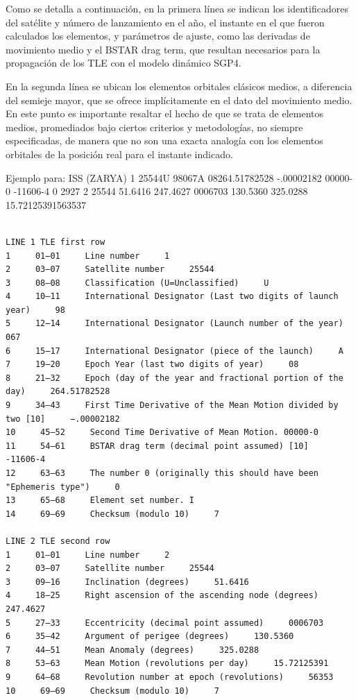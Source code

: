 Como se detalla a continuación, en la primera línea se indican los identificadores del satélite y número de lanzamiento en el año, el instante en el que fueron calculados los elementos, y parámetros de ajuste, como las derivadas de movimiento medio y el BSTAR drag term, que resultan necesarios para la propagación de los TLE con el modelo dinámico SGP4.

En la segunda línea se ubican los elementos orbitales clásicos medios, a diferencia del semieje mayor, que se ofrece implícitamente en el dato del movimiento medio. En este punto es importante resaltar el hecho de que se trata de elementos medios, promediados bajo ciertos criterios y metodologías, no siempre especificadas, de manera que no son una exacta analogía con los elementos orbitales de la posición real para el instante indicado.


Ejemplo para: ISS (ZARYA)
1 25544U 98067A   08264.51782528 -.00002182  00000-0 -11606-4 0  2927
2 25544  51.6416 247.4627 0006703 130.5360 325.0288 15.72125391563537


\begin{verbatim}
 
LINE 1 TLE first row
1     01–01     Line number     1
2     03–07     Satellite number     25544
3     08–08     Classification (U=Unclassified)     U
4     10–11     International Designator (Last two digits of launch year)     98
5     12–14     International Designator (Launch number of the year)     067
6     15–17     International Designator (piece of the launch)     A
7     19–20     Epoch Year (last two digits of year)     08
8     21–32     Epoch (day of the year and fractional portion of the day)     264.51782528
9     34–43     First Time Derivative of the Mean Motion divided by two [10]     −.00002182
10     45–52     Second Time Derivative of Mean Motion. 00000-0
11     54–61     BSTAR drag term (decimal point assumed) [10]     -11606-4
12     63–63     The number 0 (originally this should have been "Ephemeris type")     0
13     65–68     Element set number. I
14     69–69     Checksum (modulo 10)     7

LINE 2 TLE second row
1     01–01     Line number     2
2     03–07     Satellite number     25544
3     09–16     Inclination (degrees)     51.6416
4     18–25     Right ascension of the ascending node (degrees)     247.4627
5     27–33     Eccentricity (decimal point assumed)     0006703
6     35–42     Argument of perigee (degrees)     130.5360
7     44–51     Mean Anomaly (degrees)     325.0288
8     53–63     Mean Motion (revolutions per day)     15.72125391
9     64–68     Revolution number at epoch (revolutions)     56353
10     69–69     Checksum (modulo 10)     7
\end{verbatim}

